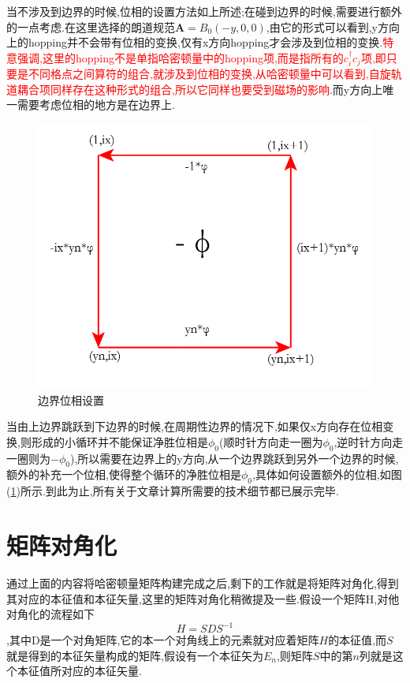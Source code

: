 \documentclass[a4paper,12pt]{ctexart}
\numberwithin{equation}{section}
\begin{document}
当不涉及到边界的时候,位相的设置方法如上所述;在碰到边界的时候,需要进行额外的一点考虑.在这里选择的朗道规范$\mathbf{A}=B_0(-y,0,0)$,由它的形式可以看到,y方向上的hopping并不会带有位相的变换,仅有x方向hopping才会涉及到位相的变换.\textcolor{red}{特意强调,这里的hopping不是单指哈密顿量中的hopping项,而是指所有的$c_i^\dagger c_j$项,即只要是不同格点之间算符的组合,就涉及到位相的变换,从哈密顿量中可以看到,自旋轨道耦合项同样存在这种形式的组合,所以它同样也要受到磁场的影响}.而y方向上唯一需要考虑位相的地方是在边界上.
\begin{figure}[ht]
\centering
\includegraphics[scale=0.45]{flux1.png}
\caption{边界位相设置}\label{boundary}
\end{figure}
当由上边界跳跃到下边界的时候,在周期性边界的情况下,如果仅x方向存在位相变换,则形成的小循环并不能保证净胜位相是$\phi_0$(顺时针方向走一圈为$\phi_0$,逆时针方向走一圈则为$-\phi_0$),所以需要在边界上的y方向,从一个边界跳跃到另外一个边界的时候,额外的补充一个位相,使得整个循环的净胜位相是$\phi_0$,具体如何设置额外的位相,如图(\ref{boundary})所示.到此为止,所有关于文章计算所需要的技术细节都已展示完毕.
\section{矩阵对角化}
通过上面的内容将哈密顿量矩阵构建完成之后,剩下的工作就是将矩阵对角化,得到其对应的本征值和本征矢量,这里的矩阵对角化稍微提及一些.假设一个矩阵H,对他对角化的流程如下$$H=SDS^{-1}$$,其中D是一个对角矩阵,它的本一个对角线上的元素就对应着矩阵$H$的本征值,而$S$就是得到的本征矢量构成的矩阵,假设有一个本征矢为$E_n$,则矩阵$S$中的第$n$列就是这个本征值所对应的本征矢量.
\end{document}
